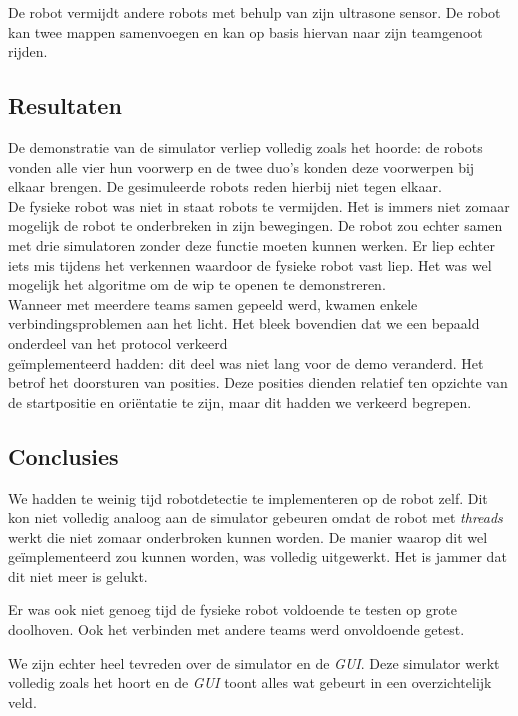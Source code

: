 \documentclass[eind]{penoverslag}
\begin{document}
De robot vermijdt andere robots met behulp van zijn ultrasone sensor. De robot kan twee mappen samenvoegen en kan op basis hiervan naar zijn teamgenoot rijden.

\subsection{Resultaten}
\label{Assec:result3}
De demonstratie van de simulator verliep volledig zoals het hoorde: de robots vonden alle vier hun voorwerp en de twee duo's konden deze voorwerpen bij elkaar brengen. De gesimuleerde robots reden hierbij niet tegen elkaar.\\

De fysieke robot was niet in staat robots te vermijden. Het is immers niet zomaar mogelijk de robot te onderbreken in zijn bewegingen. De robot zou echter samen met drie simulatoren zonder deze functie moeten kunnen werken. Er liep echter iets mis tijdens het verkennen waardoor de fysieke robot vast liep.
Het was wel mogelijk het algoritme om de wip te openen te demonstreren.\\

Wanneer met meerdere teams samen gepeeld werd, kwamen enkele verbindingsproblemen aan het licht. Het bleek bovendien dat we een bepaald onderdeel van het protocol verkeerd \\ge\"implementeerd hadden: dit deel was niet lang voor de demo veranderd. Het betrof het doorsturen van posities. Deze posities dienden relatief ten opzichte van de startpositie en ori\"entatie te zijn, maar dit hadden we verkeerd begrepen.

\subsection{Conclusies}
\label{Assec:conc3}
We hadden te weinig tijd robotdetectie te implementeren op de robot zelf. Dit kon niet volledig analoog aan de simulator gebeuren omdat de robot met \textit{threads} werkt die niet zomaar onderbroken kunnen worden. De manier waarop dit wel ge\"implementeerd zou kunnen worden, was volledig uitgewerkt. Het is jammer dat dit niet meer is gelukt.

Er was ook niet genoeg tijd de fysieke robot voldoende te testen op grote doolhoven. Ook het verbinden met andere teams werd onvoldoende getest.

We zijn echter heel tevreden over de simulator en de \textit{GUI}. Deze simulator werkt volledig zoals het hoort en de \textit{GUI} toont alles wat gebeurt in een overzichtelijk veld.
\end{document}
